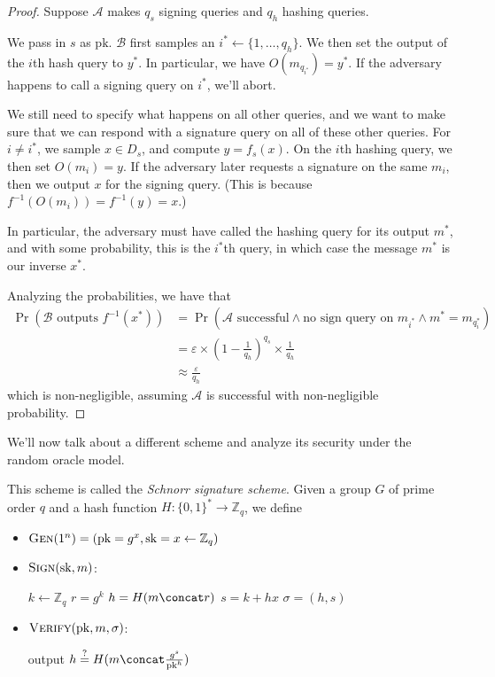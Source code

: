 \begin{proof}
    Suppose $\mathcal{A}$ makes $q_s$ signing queries and $q_h$ hashing queries.

    We pass in $s$ as $\mathrm{pk}$. $\mathcal{B}$ first samples an $i^* \gets \{1, \ldots, q_h\}$. We then set the output of the $i$th hash query to $y^*$. In particular, we have $O(m_{q_{i^*}}) = y^*$. If the adversary happens to call a signing query on $i^*$, we'll abort.

    We still need to specify what happens on all other queries, and we want to make sure that we can respond with a signature query on all of these other queries. For $i \ne i^*$, we sample $x \in D_s$, and compute $y = f_s(x)$. On the $i$th hashing query, we then set $O(m_i) = y$. If the adversary later requests a signature on the same $m_i$, then we output $x$ for the signing query. (This is because $f^{-1}(O(m_i)) = f^{-1}(y) = x$.)

    In particular, the adversary must have called the hashing query for its output $m^*$, and with some probability, this is the $i^*$th query, in which case the message $m^*$ is our inverse $x^*$.

    Analyzing the probabilities, we have that
    \begin{align*}
        \Pr(\text{$\mathcal{B}$ outputs $f^{-1}(x^*)$})
            &= \Pr(\text{$\mathcal{A}$ successful} \land \text{no sign query on $m_{i^*}$} \land m^* = m_{q_i^*}) \\
            &= \varepsilon \times \left(1 - \frac{1}{q_h}\right)^{q_s} \times \frac{1}{q_h} \\
            &\approx \frac{\varepsilon}{q_h}
    \end{align*}
    which is non-negligible, assuming $\mathcal{A}$ is successful with non-negligible probability.
\end{proof}

We'll now talk about a different scheme and analyze its security under the random oracle model.

This scheme is called the \emph{Schnorr signature scheme}. Given a group $G$ of prime order $q$ and a hash function $H : \{0, 1\}^* \to \mathbb{Z}_q$, we define
\begin{itemize}
    \item $\textsc{Gen}(1^n) = (\mathrm{pk} = g^x, \mathrm{sk} = x \gets \mathbb{Z}_q)$
    \item $\textsc{Sign}(\mathrm{sk}, m)$:
        \begin{algorithmic}
            \State $k \gets \mathbb{Z}_q$
            \State $r = g^k$
            \State $h = H(m \concat r)$
            \State $s = k + hx$
            \State $\sigma = (h, s)$
        \end{algorithmic}

    \item $\textsc{Verify}(\mathrm{pk}, m, \sigma)$:
        \begin{algorithmic}
            \State output $h \overset{?}{=} H(m \concat \frac{g^s}{\mathrm{pk}^h})$
        \end{algorithmic}
\end{itemize}


